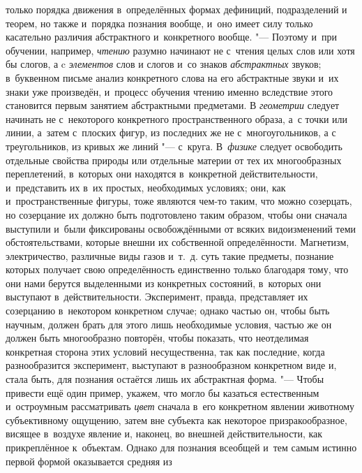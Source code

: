 только порядка движения в~определённых формах дефиниций, подразделений и
теорем, но также и~порядка познания вообще, и~оно имеет силу только
касательно различия абстрактного и~конкретного
вообще.
"--- Поэтому и~при обучении, например,
{\em чтению} разумно
начинают не с~чтения целых слов или хотя бы слогов, а c
{\em элементов} слов и
слогов и~со знаков {\em абстрактных}
звуков; в~буквенном письме анализ конкретного слова на его
абстрактные звуки и~их знаки уже произведён, и~процесс обучения чтению
именно вследствие этого становится первым занятием абстрактными предметами.
В {\em геометрии} следует
начинать не с~некоторого конкретного пространственного образа, а~с точки
или линии, а~затем с~плоских фигур, из последних же не с~многоугольников, а
с треугольников, из кривых же линий "--- с~круга. В~{\em физике} следует
освободить отдельные свойства природы или отдельные материи от тех их
многообразных переплетений, в~которых они находятся в~конкретной
действительности, и~представить их в~их простых, необходимых условиях; они,
как и~пространственные фигуры, тоже являются чем-то таким, что можно
созерцать, но созерцание их должно быть подготовлено таким образом, чтобы
они сначала выступили и~были фиксированы освобождёнными от всяких
видоизменений теми обстоятельствами, которые внешни их
собственной определённости. Магнетизм, электричество, различные виды газов
и~т.~д. суть такие предметы, познание которых получает свою определённость
единственно только благодаря тому, что они нами берутся выделенными из
конкретных состояний, в~которых они выступают в~действительности.
Эксперимент, правда, представляет их созерцанию в~некотором конкретном
случае; однако частью он, чтобы быть научным, должен брать для этого лишь
необходимые условия, частью же он должен быть многообразно повторён, чтобы
показать, что неотделимая конкретная сторона этих условий несущественна,
так как последние, когда разнообразится эксперимент, выступают в
разнообразном конкретном виде и, стала быть, для познания остаётся лишь их
абстрактная форма. "--- Чтобы привести ещё один пример, укажем,
что могло бы казаться естественным и~остроумным рассматривать
{\em цвет} сначала в~его
конкретном явлении животному субъективному ощущению, затем вне субъекта как
некоторое призракообразное, висящее в~воздухе явление и, наконец, во
внешней действительности, как прикреплённое к~объектам. Однако для познания
всеобщей и~тем самым истинно первой формой оказывается средняя из
